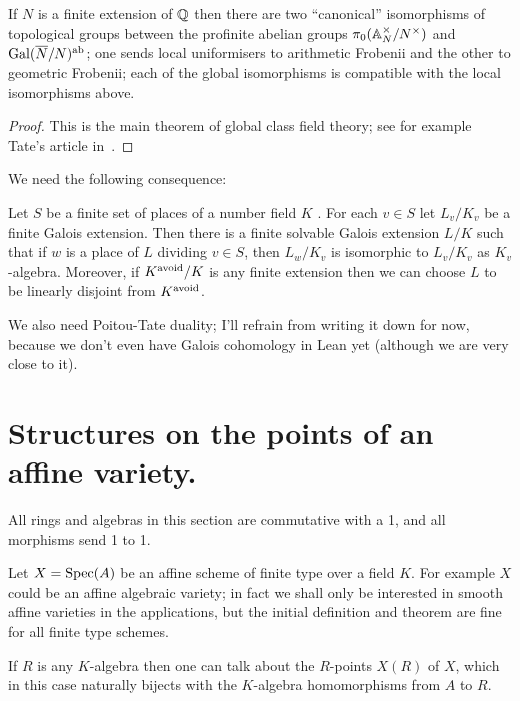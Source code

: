 \begin{theorem}\label{global_class_field_theory}\notready If $N$ is a finite extension of $\mathbb{Q}$ then there are two ``canonical'' isomorphisms of topological groups between the profinite abelian groups $\pi_0(\mathbb{A}_N^\times/N^\times)$ and $\operatorname{Gal}(\overline{N}/N)^{\operatorname{ab}}$; one sends local uniformisers to arithmetic Frobenii and the other to geometric Frobenii; each of the global isomorphisms is compatible with the local isomorphisms above.
\end{theorem}
\begin{proof}\notready This is the main theorem of global class field theory; see for example Tate's article in~\cite{cf}.
\end{proof}

We need the following consequence:

\begin{theorem}\label{Skinner_Wiles_CFT_trick}\notready Let $S$ be a finite set of places of a number field $K$ . For each $v \in S$
let $L_v/K_v$ be a finite Galois extension. Then there is a finite solvable Galois extension
$L/K$ such that if $w$ is a place of $L$ dividing $v \in S$, then $L_w/K_v$ is isomorphic to $L_v/K_v$ as $K_v$-algebra. Moreover, if $K^{\operatorname{avoid}} /K$ is
any finite extension then we can choose $L$ to be linearly disjoint from $K^{\operatorname{avoid}}$.
\end{theorem}

We also need Poitou-Tate duality; I'll refrain from writing it down for now, because we don't even have Galois cohomology in Lean yet (although we are very close to it).

\section{Structures on the points of an affine variety.}

All rings and algebras in this section are commutative with a 1, and all morphisms send 1 to 1.

Let $X=\operatorname{Spec}(A)$ be an affine scheme of finite type over a field $K$. For example $X$ could be an affine algebraic variety; in fact we shall only be interested in smooth affine varieties in the applications, but the initial definition and theorem are fine for all finite type schemes.

If $R$ is any $K$-algebra then one can talk about the $R$-points $X(R)$ of $X$, which in this case
naturally bijects with the $K$-algebra homomorphisms from $A$ to $R$.

